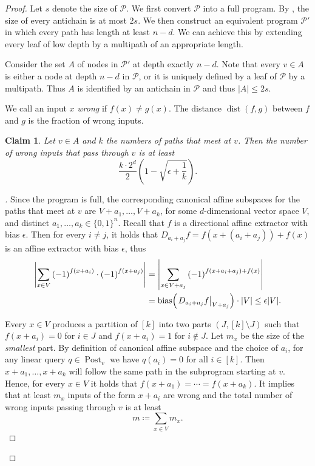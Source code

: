 \documentclass[10pt,a4paper]{article}
\newtheorem{claim}[theorem]{Claim}
\theoremstyle{definition}
\theoremstyle{remark}
\newenvironment{claimproof}[1][\proofname]{\begin{proof}[#1]\renewcommand*{\qedsymbol}{$\blacksquare$}}{\end{proof}}
\DeclareMathOperator{\dist}{dist}
\DeclareMathOperator{\post}{Post}
\DeclareMathOperator{\bias}{bias}
\newcommand{\card}[1]{{\left|#1\right|}}
\newcommand{\Q}{{\{0,1\}}}
\newcommand{\calP}{\mathcal{P}}
\newcommand{\restr}[2]{\left.#1\right|_{#2}}
\begin{document}
\begin{proof}
  Let $s$ denote the size of $\calP$. We first convert $\calP$ into a full program. By , the size of every antichain is at most $2s$. We then construct an equivalent program $\calP'$ in which every path has length at least $n-d$. We can achieve this by extending every leaf of low depth by a multipath of an appropriate length. 

  Consider the set $A$ of nodes in $\calP'$ at depth exactly $n-d$. Note that every $v \in A$ is either a node at depth $n - d$ in $\calP$, or it is uniquely defined by a leaf of $\calP$ by a multipath. Thus $A$ is identified by an antichain in $\calP$ and thus $\card{A} \le 2s$.

  We call an input $x$ \emph{wrong} if $f(x) \neq g(x)$. The distance $\dist(f, g)$ between $f$ and $g$ is the fraction of wrong inputs.

  \begin{claim}\label{clm:avg_case_1}
    Let $v \in A$ and $k$ the numbers of paths that meet at $v$. Then the number of wrong inputs that pass through $v$ is at least
    \[
      \frac{k\cdot 2^d}{2} \left(1-\sqrt{\epsilon+\frac{1}{k}}\right).
    \]
  \end{claim}
  \begin{claimproof}
    Since the program is full, the corresponding canonical affine subspaces for the paths that meet at $v$ are $V+a_1, \ldots, V+a_k$, for some $d$-dimensional vector space $V$, and distinct $a_1, \ldots, a_k \in \Q^n$.
    Recall that $f$ is a directional affine extractor with bias $\epsilon$. Then for every $i \neq j$, it holds that $D_{a_i + a_j} f = f(x+(a_i + a_j)) + f(x)$ is an affine extractor with bias $\epsilon$, thus
    \begin{equation}\label{eq:extractor_assumption}
      \begin{aligned}
        \left|\sum_{x \in V} {(-1)}^{f(x+a_i)} \cdot {(-1)}^{f(x+a_j)}\right| &=
        \left|\sum_{x \in V + a_j} {(-1)}^{f(x+a_i+a_j) + f(x)}\right| \\ &=
        \bias\mathopen{}\mathclose\bgroup\left(\restr{D_{a_i + a_j} f}{V+a_j}\aftergroup\egroup\right) \cdot \card{V} \le \epsilon \card{V}.
      \end{aligned}
    \end{equation}

    Every $x \in V$ produces a partition of $[k]$ into two parts $(J, [k] \setminus J)$ such that $f(x+a_i) = 0$ for $i \in J$ and $f(x+a_i) = 1$ for $i \not\in J$. Let $m_x$ be the size of the \emph{smallest} part.
    By definition of canonical affine subspace and the choice of $a_i$, for any linear query $q \in \post_v$ we have $q(a_i) = 0$ for all $i \in [k]$. Then $x+a_1, \ldots, x+a_k$ will follow the same path in the subprogram starting at $v$. Hence, for every $x \in V$ it holds that $f(x+a_1) = \cdots = f(x+a_k)$. It implies that at least $m_x$ inputs of the form $x+a_i$ are wrong and the total number of wrong inputs passing through $v$ is at least
    \[
      m \coloneqq \sum_{x \in V} m_x.
    \]
  

\end{claimproof}
\end{proof}
\end{document}
